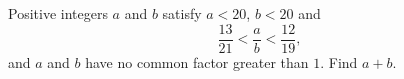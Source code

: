 Positive integers $a$ and $b$ satisfy $a<20$, $b<20$ and
\[\dfrac{13}{21}<\dfrac ab<\dfrac{12}{19},\]
and $a$ and $b$ have no common factor greater than $1$. Find $a+b$.
